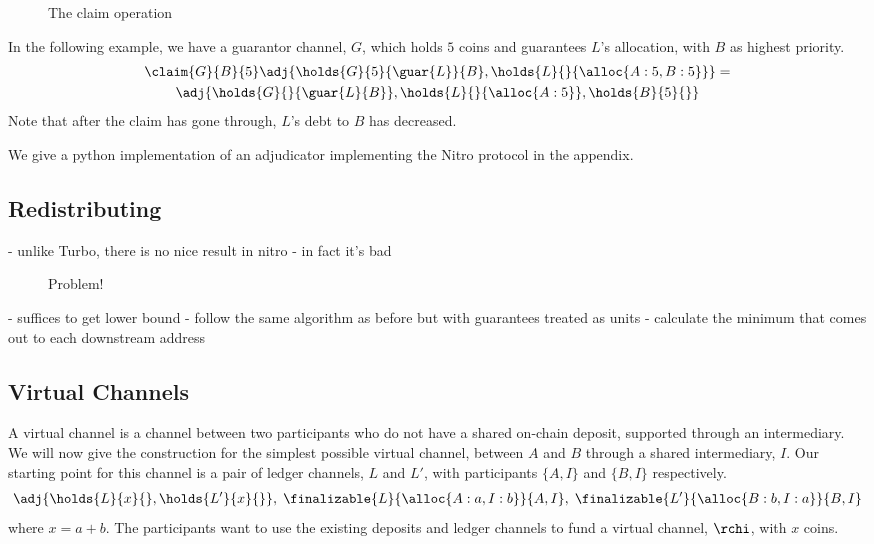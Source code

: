 \begin{figure}[ht]\centering
  \makebox[\textwidth][c]{}
  \caption{The claim operation}
  \label{fig:claim-operation}
\end{figure}

\begin{example}
  In the following example, we have a guarantor channel, $G$, which holds $5$ coins and guarantees $L$'s allocation, with $B$ as highest priority.
  \begin{multline}
    \claim{G}{B}{5}\adj{\holds{G}{5}{\guar{L}}{B}, \holds{L}{}{\alloc{A: 5, B: 5}}} = \\ \adj{\holds{G}{}{\guar{L}{B}}, \holds{L}{}{\alloc{A: 5}}, \holds{B}{5}{}}
  \end{multline}
  Note that after the claim has gone through, $L$'s debt to $B$ has decreased.
\end{example}

We give a python implementation of an adjudicator implementing the Nitro protocol in the appendix.

\subsection{Redistributing}

- unlike Turbo, there is no nice result in nitro
- in fact it's bad

\begin{figure}[ht]\centering
  \makebox[\textwidth][c]{}
  \caption{Problem!}
  \label{fig:claim-redistribution-problem}
\end{figure}

- suffices to get lower bound 
- follow the same algorithm as before but with guarantees treated as units
- calculate the minimum that comes out to each downstream address

\subsection{Virtual Channels}

A virtual channel is a channel between two participants who do not have a shared on-chain deposit, supported through an intermediary.
We will now give the construction for the simplest possible virtual channel, between $A$ and $B$ through a shared intermediary, $I$.
Our starting point for this channel is a pair of ledger channels, $L$ and $L'$, with participants $\{A,I\}$ and $\{B,I\}$ respectively.
\begin{align}
  \adj{\holds{L}{x}{}, \holds{L'}{x}{}}, \; \finalizable{L}{\alloc{A:a, I:b}}{A, I}, \; \finalizable{L'}{\alloc{B: b, I: a}}{B, I} \label{eq:virtual-channel-start-state}
\end{align}
where $x = a + b$.
The participants want to use the existing deposits and ledger channels to fund a virtual channel, $\rchi$, with $x$ coins.

